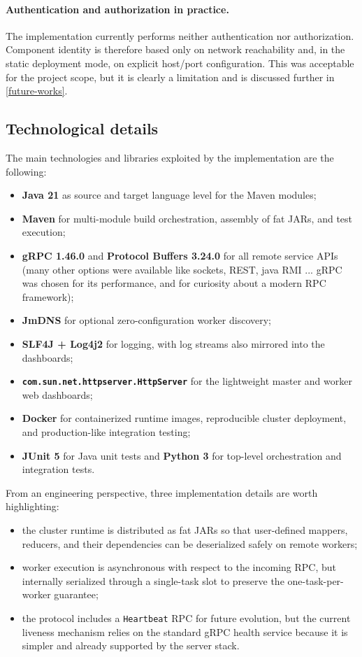 \documentclass{scrartcl}
\begin{document}
\paragraph{Authentication and authorization in practice.}
The implementation currently performs neither authentication nor authorization. Component identity is therefore based only on network reachability and, in the static deployment mode, on explicit host/port configuration. This was acceptable for the project scope, but it is clearly a limitation and is discussed further in \cref{future-works}.

\subsection{Technological details}\label{technological-details}
The main technologies and libraries exploited by the implementation are the following:
%
\begin{itemize}
    \item \textbf{Java 21} as source and target language level for the Maven modules;
    \item \textbf{Maven} for multi-module build orchestration, assembly of fat JARs, and test execution;
    \item \textbf{gRPC 1.46.0} and \textbf{Protocol Buffers 3.24.0} for all remote service APIs (many other options were available like sockets, REST, java RMI ... gRPC was chosen for its performance, and for curiosity about a modern RPC framework);
    \item \textbf{JmDNS} for optional zero-configuration worker discovery;
    \item \textbf{SLF4J + Log4j2} for logging, with log streams also mirrored into the dashboards;
    \item \textbf{\texttt{com.sun.net.httpserver.HttpServer}} for the lightweight master and worker web dashboards;
    \item \textbf{Docker} for containerized runtime images, reproducible cluster deployment, and production-like integration testing;
    \item \textbf{JUnit 5} for Java unit tests and \textbf{Python 3} for top-level orchestration and integration tests.
\end{itemize}

From an engineering perspective, three implementation details are worth highlighting:
%
\begin{itemize}
    \item the cluster runtime is distributed as fat JARs so that user-defined mappers, reducers, and their dependencies can be deserialized safely on remote workers;
    \item worker execution is asynchronous with respect to the incoming RPC, but internally serialized through a single-task slot to preserve the one-task-per-worker guarantee;
    \item the protocol includes a \texttt{Heartbeat} RPC for future evolution, but the current liveness mechanism relies on the standard gRPC health service because it is simpler and already supported by the server stack.
\end{itemize}
\end{document}
